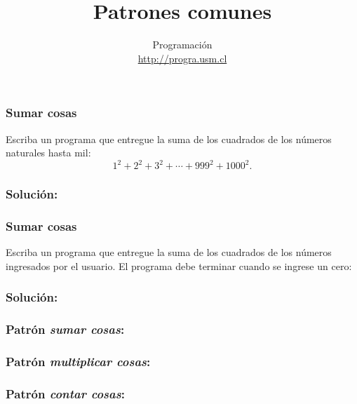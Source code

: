 \documentclass[12pt]{beamer}
\title{Patrones comunes}
\author{
  Programación \\ \url{http://progra.usm.cl}
}
\date{}
\begin{document}
  \begin{frame}
    \maketitle
  \end{frame}

  \begin{frame}
    \frametitle{Sumar cosas}
    \label{problema-suma-cuadrados-menores-que-mil}
    Escriba un programa que entregue la suma
    de los cuadrados de los números naturales hasta mil:
    \[
      1^2 + 2^2 + 3^2 + \cdots + 999^2 + 1000^2.
    \]
  \end{frame}

  \begin{frame}
    \frametitle{Solución:}
    \label{solucion-suma-cuadrados-menores-que-mil}
    
  \end{frame}

  \begin{frame}
    \frametitle{Sumar cosas}
    \label{problema-suma-cuadrados-hasta-cero}
    Escriba un programa que entregue la suma
    de los cuadrados de los números ingresados por el usuario.
    El programa debe terminar
    cuando se ingrese un cero:
    
  \end{frame}

  \begin{frame}
    \frametitle{Solución:}
    \label{solucion-suma-cuadrados-hasta-cero}
    
  \end{frame}

  \begin{frame}
    \frametitle{Patrón \emph{sumar cosas}:}
    \label{patron-sumar}
    
  \end{frame}

  \begin{frame}
    \frametitle{Patrón \emph{multiplicar cosas}:}
    \label{patron-multiplicar}
    
  \end{frame}

  \begin{frame}
    \frametitle{Patrón \emph{contar cosas}:}
    \label{patron-contar}
    
  \end{frame}
\end{document}
